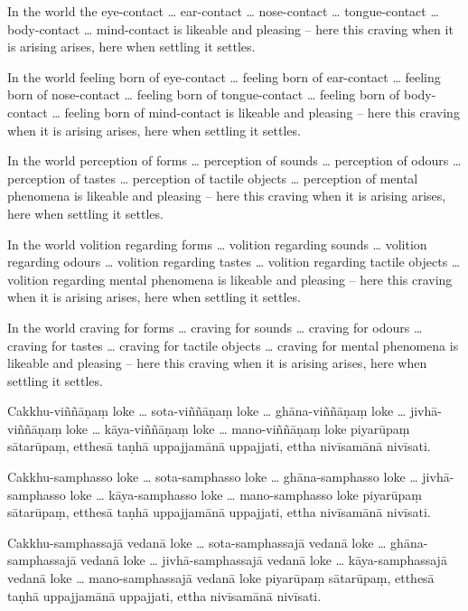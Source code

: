In the world the eye-contact \ldots{} ear-contact \ldots{} nose-contact \ldots{}
tongue-contact \ldots{} body-contact \ldots{} mind-contact is likeable and
pleasing -- here this craving when it is arising arises, here when settling it
settles.

In the world feeling born of eye-contact \ldots{} feeling born of ear-contact
\ldots{} feeling born of nose-contact \ldots{} feeling born of tongue-contact
\ldots{} feeling born of body-contact \ldots{} feeling born of mind-contact is
likeable and pleasing -- here this craving when it is arising arises, here when
settling it settles.

In the world perception of forms \ldots{} perception of sounds \ldots{}
perception of odours \ldots{} perception of tastes \ldots{} perception of
tactile objects \ldots{} perception of mental phenomena is likeable and pleasing
-- here this craving when it is arising arises, here when settling it settles.

In the world volition regarding forms \ldots{} volition regarding sounds
\ldots{} volition regarding odours \ldots{} volition regarding tastes \ldots{}
volition regarding tactile objects \ldots{} volition regarding mental phenomena
is likeable and pleasing -- here this craving when it is arising arises, here
when settling it settles.

In the world craving for forms \ldots{} craving for sounds \ldots{} craving for
odours \ldots{} craving for tastes \ldots{} craving for tactile objects \ldots{}
craving for mental phenomena is likeable and pleasing -- here this craving when
it is arising arises, here when settling it settles.

\paliPage

Cakkhu-viññāṇaṃ loke \ldots{} sota-viññāṇaṃ loke \ldots{} ghāna-viññāṇaṃ loke
\ldots{} jivhā-viññāṇaṃ loke \ldots{} kāya-viññāṇaṃ loke \ldots{} mano-viññāṇaṃ
loke piyarūpaṃ sātarūpaṃ, etthesā taṇhā uppajjamānā uppajjati, ettha nivīsamānā
nivīsati.

Cakkhu-samphasso loke \ldots{} sota-samphasso loke \ldots{} ghāna-samphasso loke
\ldots{} jivhā-samphasso loke \ldots{} kāya-samphasso loke \ldots{} mano-samphasso
loke piyarūpaṃ sātarūpaṃ, etthesā taṇhā uppajjamānā uppajjati, ettha nivīsamānā
nivīsati.

Cakkhu-samphassajā vedanā loke \ldots{} sota-samphassajā vedanā loke \ldots{}
ghāna-samphassajā vedanā loke \ldots{} jivhā-samphassajā vedanā loke \ldots{}
kāya-samphassajā vedanā loke \ldots{} mano-samphassajā vedanā loke piyarūpaṃ
sātarūpaṃ, etthesā taṇhā uppajjamānā uppajjati, ettha nivīsamānā nivīsati.


